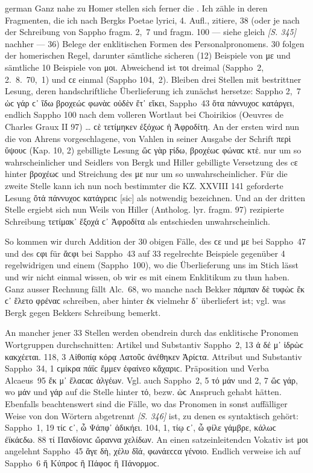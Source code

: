 \begin{otherlanguage*}{german}
Ganz nahe zu Homer stellen sich ferner die . Ich zähle in deren Fragmenten, die ich nach Bergks Poetae lyrici, 4. Aufl., zitiere, 38 (oder je nach der Schreibung von Sappho fragm. 2,~7 und fragm. 100 — siehe gleich \hypertarget{p345}{\emph{[S. 345]}}\label{p345} nachher — 36) Belege der enklitischen Formen des Personalpronomens. 30 folgen der homerischen Regel, darunter sämtliche sicheren (12) Beispiele von με und sämtliche 10 Beispiele von μοι. Abweichend ist τοι dreimal (Sappho~2, 2.~8.~70,~1) und ϲε einmal (Sappho 104,~2). Bleiben drei Stellen mit bestrittner Lesung, deren handschriftliche Überlieferung ich zunächst hersetze: Sappho 2,~7 ὡϲ γάρ ϲ᾽ ἴδω βροχεώϲ  φωνὰϲ οὐδὲν ἔτ᾽ εἴκει, Sappho~43 ὄτα πάννυχοϲ  κατάργει, endlich Sappho 100 nach dem volleren Wortlaut bei Choirikios (Oeuvres de Charles Graux II 97) … ϲὲ τετίμηκεν ἐξόχωϲ ἡ Ἀφροδίτη. An der ersten wird nun die von Ahrens vorgeschlagene, von Vahlen in seiner Ausgabe der Schrift περὶ ὕψουϲ (Kap. 10, 2) gebilligte Lesung ὥϲ  γὰρ ϝίδω, βροχέωϲ  φώναϲ κτἑ. nur um so wahrscheinlicher und Seidlers von Bergk und Hiller gebilligte Versetzung des cε hinter βροχέωϲ und Streichung des με nur um so unwahrscheinlicher. Für die zweite Stelle kann ich nun noch bestimmter die KZ. XXVIII 141 geforderte Lesung ὄτά  πάννυχοϲ κατάγρειϲ [sic] als notwendig bezeichnen. Und an der dritten Stelle ergiebt sich nun Weils von Hiller (Antholog. lyr. fragm. 97) rezipierte Schreibung τετίμακ᾽ ἔξοχά ϲ᾽ Ἀφροδίτα als entschieden unwahrscheinlich.

So kommen wir durch Addition der 30 obigen Fälle, des ϲε und με bei Sappho~47 und des ϲφι für ἄϲφι bei Sappho~43 auf 33 regelrechte Beispiele gegenüber 4 regelwidrigen und einem (Sappho~100), wo die Überlieferung uns im Stich lässt und wir nicht einmal wissen, ob wir es mit einem Enklitikum zu thun haben. Ganz ausser Rechnung fällt Alc.~68, wo manche nach Bekker πάμπαν δὲ τυφὼϲ ἔκ ϲ᾽ ἕλετο φρέναϲ schreiben, aber hinter ἐκ vielmehr δ᾽ überliefert ist; vgl. was Bergk gegen Bekkers Schreibung bemerkt.

An mancher jener 33 Stellen werden obendrein durch das enklitische Pronomen Wortgruppen durchschnitten: Artikel und Substantiv Sappho~2, 13 ἀ δέ μ᾽ ἰδρὼϲ κακχέεται. 118, 3 Αἰθοπίᾳ  κόρᾳ Λατοῦϲ ἀνέθηκεν Ἀρίϲτα. Attribut und Substantiv Sappho~34, 1 ϲμίκρα  πάϊϲ ἔμμεν ἐφαίνεο κἄχαριϲ. Präposition und Verba Alcaeus~95 ἔκ μ᾽ ἔλαϲαϲ ἀλγέων. Vgl. auch Sappho~2, 5 τό  μάν und 2, 7 ὥϲ  γάρ, wo μάν und γάρ auf die Stelle hinter τό, bezw. ὡϲ Anspruch gehabt hätten. Ebenfalls beachtenswert sind die Fälle, wo das Pronomen in sonst auffälliger Weise von don Wörtern abgetrennt \hypertarget{p346}{\emph{[S. 346]}}\label{p346} ist, zu denen es syntaktisch gehört: Sappho~1, 19 τίϲ ϲ᾽, ὦ Ψάπφ᾽ ἀδικήει. 104, 1, τίῳ ϲ᾽, ὦ φίλε γάμβρε, κάλωϲ ἐϊκάϲδω. 88 τί  Πανδίονιϲ ὤραννα χελίδων. An einen satzeinleitendcn Vokativ ist μοι angelehnt Sappho~45 ἄγε δὴ, χέλυ δῖά,  φωνάεϲϲα γένοιο. Endlich verweise ich auf Sappho~6 ἤ  Κύπροϲ ἢ Πάφοϲ ἢ Πάνορμοϲ.


\end{otherlanguage*}
